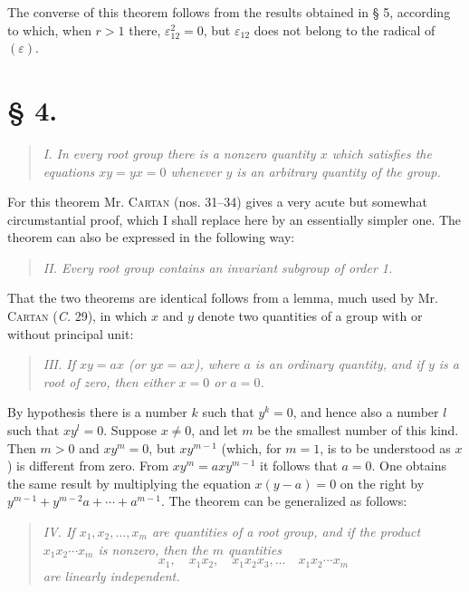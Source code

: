 \documentclass[11pt]{article}
\newcommand{\eps}{\varepsilon}
\begin{document}
The converse of this theorem follows from the results obtained in § 5, according to which, when $r>1$ there, $\eps_{12}^2=0$, but $\eps_{12}$ does not belong to the radical of $(\eps)$.

\section*{§ 4.}

\begin{quote}\itshape
I. In every root group there is a nonzero quantity $x$ which satisfies the equations $xy=yx=0$ whenever $y$ is an arbitrary quantity of the group.
\end{quote}

For this theorem Mr. \textsc{Cartan} (nos. 31--34) gives a very acute but somewhat circumstantial proof, which I shall replace here by an essentially simpler one. The theorem can also be expressed in the following way:

\begin{quote}\itshape
II. Every root group contains an invariant subgroup of order 1.
\end{quote}

That the two theorems are identical follows from a lemma, much used by Mr. \textsc{Cartan} (\emph{C.} 29), in which $x$ and $y$ denote two quantities of a group with or without principal unit:

\begin{quote}\itshape
III. If $xy=ax$ (or $yx=ax$), where $a$ is an ordinary quantity, and if $y$ is a root of zero, then either $x=0$ or $a=0$.
\end{quote}

By hypothesis there is a number $k$ such that $y^k=0$, and hence also a number $l$ such that $xy^l=0$. Suppose $x\neq0$, and let $m$ be the smallest number of this kind. Then $m>0$ and $xy^m=0$, but $xy^{m-1}$ (which, for $m=1$, is to be understood as $x$) is different from zero. From $xy^m=axy^{m-1}$ it follows that $a=0$. One obtains the same result by multiplying the equation $x(y-a)=0$ on the right by $y^{m-1}+y^{m-2}a+\cdots+a^{m-1}$. The theorem can be generalized as follows:

\begin{quote}\itshape
IV. If $x_1,x_2,\ldots,x_m$ are quantities of a root group, and if the product $x_1x_2\cdots x_m$ is nonzero, then the $m$ quantities
\[
 x_1,
 \quad x_1x_2,
 \quad x_1x_2x_3,
 \ldots
 \quad x_1x_2\cdots x_m
\]
are linearly independent.
\end{quote}
\end{document}
